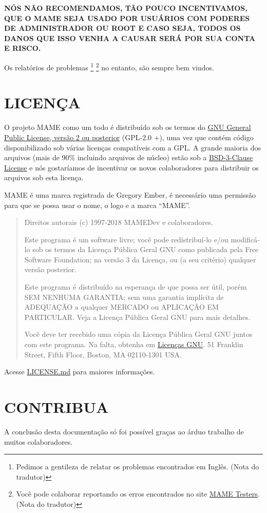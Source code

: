 \documentclass[letterpaper,10pt,brazil]{sphinxmanual}
\begin{document}
\textbf{NÓS NÃO RECOMENDAMOS, TÃO POUCO INCENTIVAMOS, QUE O MAME SEJA USADO
POR USUÁRIOS COM PODERES DE ADMINISTRADOR OU ROOT E CASO SEJA, TODOS OS
DANOS QUE ISSO VENHA A CAUSAR SERÁ POR SUA CONTA E RISCO.}

Os relatórios de problemas \footnote[1]{\sphinxAtStartFootnote%
Pedimos a gentileza de relatar os problemas encontrados em
Inglês. (Nota do tradutor)
} \footnote[2]{\sphinxAtStartFootnote%
Você pode colaborar reportando os erros encontrados no site
\href{https://mametesters.org/view\_all\_bug\_page.php}{MAME Testers}.
(Nota do tradutor)
} no entanto, são sempre bem
vindos.


\chapter{LICENÇA}
\label{license:licenca}\label{license::doc}\label{license:mame-license}
O projeto MAME como um todo é distribuído sob os termos do \href{https://opensource.org/licenses/GPL-2.0}{GNU General
Public License, versão 2 ou posterior} (GPL-2.0 +), uma vez que
contém código disponibilizado sob várias licenças compatíveis com a GPL.
A grande maioria dos arquivos (mais de 90\% incluindo arquivos de núcleo)
estão sob a
\href{http://opensource.org/licenses/BSD-3-Clause}{BSD-3-Clause License} e
nós gostaríamos de incentivar os novos colaboradores para distribuir os
arquivos sob esta licença.

MAME é uma marca registrada de Gregory Ember, é necessário uma permissão
para que se possa usar o nome, o logo e a marca ``MAME''.
\begin{quote}

Direitos autorais (c) 1997-2018 MAMEDev e colaboradores.

Este programa é um software livre; você pode redistribuí-lo e/ou
modificá-lo sob os termos da Licença Pública Geral GNU como
publicada pela Free Software Foundation; na versão 3 da Licença, ou
(a seu critério) qualquer versão posterior.

Este programa é distribuído na esperança de que possa ser útil,
porém SEM NENHUMA GARANTIA; sem uma garantia implícita de ADEQUAÇÃO
a qualquer MERCADO ou APLICAÇÃO EM PARTICULAR.
Veja a Licença Pública Geral GNU para mais detalhes.

Você deve ter recebido uma cópia da Licença Pública Geral GNU juntos
com este programa.
Na falta, obtenha em \href{https://www.gnu.org/licenses/}{Licenças GNU}.
51 Franklin Street, Fifth Floor, Boston, MA 02110-1301 USA.
\end{quote}

Acesse
\href{https://github.com/mamedev/mame/blob/master/LICENSE.md}{LICENSE.md}
para maiores informações.


\chapter{CONTRIBUA}
\label{index:contribua}
A conclusão desta documentação só foi possível graças ao árduo trabalho
de muitos colaboradores.



\renewcommand{\indexname}{Índice}
\printindex
\end{document}
